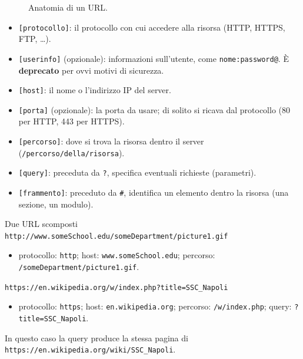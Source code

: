 \begin{figure}[H]
\centering
{}
\caption{Anatomia di un URL.}
\end{figure}

\begin{itemize}
    \item \texttt{[protocollo]}: il protocollo con cui accedere alla risorsa (HTTP, HTTPS, FTP, \dots).
    \item \texttt{[userinfo]} (opzionale): informazioni sull'utente, come \texttt{nome:password@}. È
          \textbf{deprecato} per ovvi motivi di sicurezza.
    \item \texttt{[host]}: il nome o l'indirizzo IP del server.
    \item \texttt{[porta]} (opzionale): la porta da usare; di solito si ricava dal protocollo (80 per HTTP,
          443 per HTTPS).
    \item \texttt{[percorso]}: dove si trova la risorsa dentro il server (\texttt{/percorso/della/risorsa}).
    \item \texttt{[query]}: preceduta da \texttt{?}, specifica eventuali richieste (parametri).
    \item \texttt{[frammento]}: preceduto da \texttt{\#}, identifica un elemento dentro la risorsa (una
          sezione, un modulo).
\end{itemize}

\begin{esempio}{Due URL scomposti}
\texttt{http://www.someSchool.edu/someDepartment/picture1.gif}
\begin{itemize}
    \item protocollo: \texttt{http}; host: \texttt{www.someSchool.edu}; percorso: \texttt{/someDepartment/picture1.gif}.
\end{itemize}
\texttt{https://en.wikipedia.org/w/index.php?title=SSC\_Napoli}
\begin{itemize}
    \item protocollo: \texttt{https}; host: \texttt{en.wikipedia.org}; percorso: \texttt{/w/index.php};
          query: \texttt{?title=SSC\_Napoli}.
\end{itemize}
In questo caso la query produce la stessa pagina di \texttt{https://en.wikipedia.org/wiki/SSC\_Napoli}.
\end{esempio}

